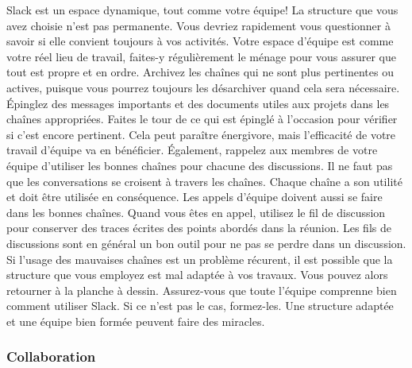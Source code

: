 \documentclass[
  letterpaper,
]{scrbook}
\begin{document}
Slack est un espace dynamique, tout comme votre équipe! La structure que
vous avez choisie n'est pas permanente. Vous devriez rapidement vous
questionner à savoir si elle convient toujours à vos activités. Votre
espace d'équipe est comme votre réel lieu de travail, faites-y
régulièrement le ménage pour vous assurer que tout est propre et en
ordre. Archivez les chaînes qui ne sont plus pertinentes ou actives,
puisque vous pourrez toujours les désarchiver quand cela sera
nécessaire. Épinglez des messages importants et des documents utiles aux
projets dans les chaînes appropriées. Faites le tour de ce qui est
épinglé à l'occasion pour vérifier si c'est encore pertinent. Cela peut
paraître énergivore, mais l'efficacité de votre travail d'équipe va en
bénéficier. Également, rappelez aux membres de votre équipe d'utiliser
les bonnes chaînes pour chacune des discussions. Il ne faut pas que les
conversations se croisent à travers les chaînes. Chaque chaîne a son
utilité et doit être utilisée en conséquence. Les appels d'équipe
doivent aussi se faire dans les bonnes chaînes. Quand vous êtes en
appel, utilisez le fil de discussion pour conserver des traces écrites
des points abordés dans la réunion. Les fils de discussions sont en
général un bon outil pour ne pas se perdre dans un discussion. Si
l'usage des mauvaises chaînes est un problème récurent, il est possible
que la structure que vous employez est mal adaptée à vos travaux. Vous
pouvez alors retourner à la planche à dessin. Assurez-vous que toute
l'équipe comprenne bien comment utiliser Slack. Si ce n'est pas le cas,
formez-les. Une structure adaptée et une équipe bien formée peuvent
faire des miracles.

\hypertarget{collaboration}{%
\subsubsection{Collaboration}\label{collaboration}}
\end{document}
